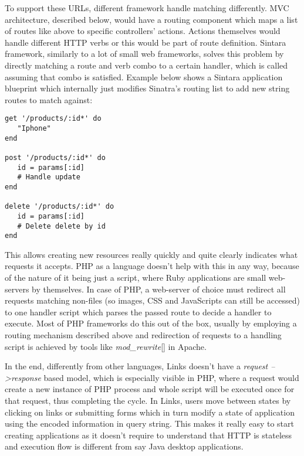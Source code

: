 To support these URLs, different framework handle matching differently. MVC architecture, described below, would have a routing component which maps a list of routes like above to specific controllers' actions. Actions themselves would handle different HTTP verbs or this would be part of route definition. Sintara framework, similarly to a lot of small web frameworks, solves this problem by directly matching a route and verb combo to a certain handler, which is called assuming that combo is satisfied. Example below shows a Sintara application blueprint which internally just modifies Sinatra's routing list to add new string routes to match against:

\begin{codelisting}
\begin{verbatim}
get '/products/:id*' do
   "Iphone"
end

post '/products/:id*' do
   id = params[:id]
   # Handle update
end

delete '/products/:id*' do
   id = params[:id]
   # Delete delete by id
end
\end{verbatim}
\end{codelisting}

This allows creating new resources really quickly and quite clearly indicates what requests it accepts. PHP as a language doesn't help with this in any way, because of the nature of it being just a script, where Ruby applications are small web-servers by themselves. In case of PHP, a web-server of choice must redirect all requests matching non-files (so images, CSS and JavaScripts can still be accessed) to one handler script which parses the passed route to decide a handler to execute. Most of PHP frameworks do this out of the box, usually by employing a routing mechanism described above and redirection of requests to a handling script is achieved by tools like \textit{mod\_rewrite}[] in Apache.

In the end, differently from other languages, Links doesn't have a \textit{request --\textgreater  response} based model, which is especially visible in PHP, where a request would create a new instance of PHP process and whole script will be executed once for that request, thus completing the cycle. In Links, users move between states by clicking on links or submitting forms which in turn modify a state of application using the encoded information in query string. This makes it really easy to start creating applications as it doesn't require to understand that HTTP is stateless and execution flow is different from say Java desktop applications.

